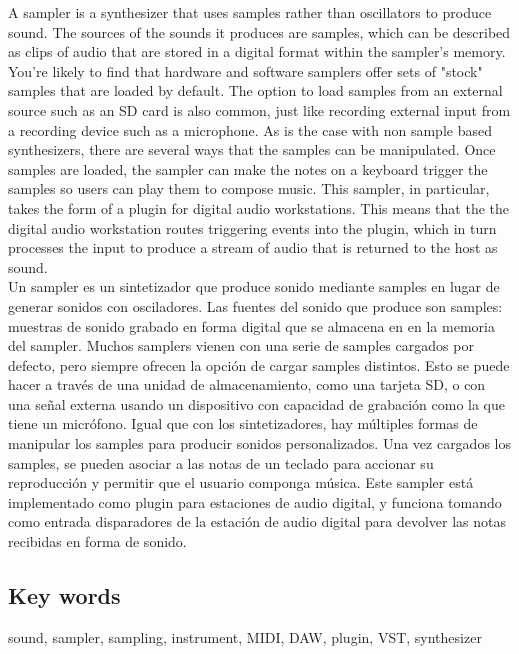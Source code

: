 \documentclass[12pt , a4paper]{article}
\begin{document}
	\begin{multicols}{2}
	A sampler is a synthesizer that uses samples rather than oscillators to produce sound.  The sources of the sounds it produces are samples, which can be described as clips of audio that are stored in a digital format within the sampler's memory. You're likely to find that hardware and software samplers offer sets of "stock" samples that are loaded by default. The option to load samples from an external source such as an SD card is also common, just like recording external input from a recording device such as a microphone. As is the case with non sample based synthesizers, there are several ways that the samples can be manipulated. Once samples are loaded, the sampler can make the notes on a keyboard trigger the samples so users can play them to compose music. This sampler, in particular, takes the form of a plugin for digital audio workstations. This means that the the digital audio workstation routes triggering events into the plugin, which in turn processes the input to produce a stream of audio that is returned to the host as sound.\\


	Un sampler es un sintetizador que produce sonido mediante samples en lugar de generar sonidos con osciladores. Las fuentes del sonido que produce son samples: muestras de sonido grabado en forma digital que se almacena en en la memoria del sampler. Muchos samplers vienen con una serie de samples cargados por defecto, pero siempre ofrecen la opción de cargar samples distintos. Esto se puede hacer a través de una unidad de almacenamiento, como una tarjeta SD, o con una señal externa usando un dispositivo con capacidad de grabación como la que tiene un micrófono. Igual que con los sintetizadores, hay múltiples formas de manipular los samples para producir sonidos personalizados. Una vez cargados los samples, se pueden asociar a las notas de un teclado para accionar su reproducción y permitir que el usuario componga música. Este sampler está implementado como plugin para estaciones de audio digital, y funciona tomando como entrada disparadores de la estación de audio digital para devolver las notas recibidas en forma de sonido. 
	\end{multicols}
	\subsection{Key words}
	sound, sampler, sampling, instrument, MIDI, DAW, plugin, VST, synthesizer\\
\end{document}

